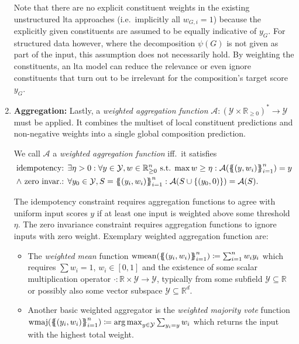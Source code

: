\begin{enumerate}[label=\textbf{\arabic*.}]
		Note that there are no explicit constituent weights in the existing unstructured \ac{lta} approaches (i.e.\ implicitly all $w_{G, i} = 1$) because the explicitly given constituents are assumed to be equally indicative of $y_G$.
		For structured data however, where the decomposition $\psi(G)$ is not given as part of the input, this assumption does not necessarily hold.
		By weighting the constituents, an \ac{lta} model can reduce the relevance or even ignore constituents that turn out to be irrelevant for the composition's target score $y_G$.
	\item \textbf{Aggregation:}
		Lastly, a \textit{weighted aggregation function} $\mathcal{A}: {(\mathcal{Y} \times \mathbb{R}_{\geq 0})}^{*} \to \mathcal{Y}$ must be applied.
		It combines the multiset of local constituent predictions and non-negative weights into a single global composition prediction.
		\begin{defn}\label{defn:ltag:weighted-agg}
			We call $\mathcal{A}$ a \textit{weighted aggregation function} iff.\ it satisfies
			\begin{align*}
				\text{idempotency: } & \exists \eta > 0: \forall y \in \mathcal{Y}, w \in \mathbb{R}_{\geq 0}^n\text{ s.t. }{\max w} \geq \eta: \mathcal{A}({\ldblbrace (y, w_i) \rdblbrace}_{i=1}^n) = y \\
				\land\text{ zero invar.: } & \forall y_0 \in \mathcal{Y}, S = {\ldblbrace (y_i, w_i) \rdblbrace}_{i=1}^n: \mathcal{A}(S \cup \{ (y_0, 0) \}) = \mathcal{A}(S) \text{.}
			\end{align*}
		\end{defn}
		{\setlength{\parskip}{0pt}The idempotency constraint requires aggregation functions to agree with uniform input scores $y$ if at least one input is weighted above some threshold $\eta$.
		The zero invariance constraint requires aggregation functions to ignore inputs with zero weight.
		Exemplary weighted aggregation function are:}
		\begin{itemize}
			\item The \textit{weighted mean} function $\wmean({\ldblbrace (y_i, w_i) \rdblbrace}_{i=1}^n) \coloneqq \sum_{i=1}^n w_i y_i$ which requires $\sum w_i = 1$, $w_i \in [0, 1]$ and the existence of some scalar multiplication operator $\cdot: \mathbb{R} \times \mathcal{Y} \to \mathcal{Y}$, typically from some subfield $\mathcal{Y} \subseteq \mathbb{R}$ or possibly also some vector subspace $\mathcal{Y} \subseteq \mathbb{R}^d$.
			\item Another basic weighted aggregator is the \textit{weighted majority vote} function $\wmaj({\ldblbrace (y_i, w_i) \rdblbrace}_{i=1}^n) \coloneqq {\arg\max}_{y \in \mathcal{Y}} \sum_{y_i = y} w_i$ which returns the input with the highest total weight.

\end{itemize}
\end{enumerate}
